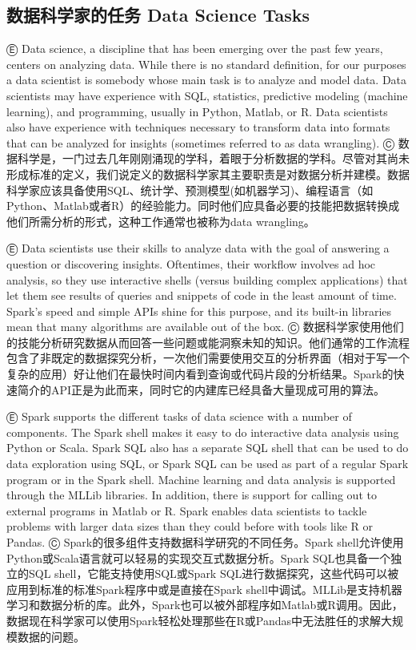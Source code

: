 \subsection{数据科学家的任务 Data Science
Tasks}\label{ux6570ux636eux79d1ux5b66ux5bb6ux7684ux4efbux52a1-data-science-tasks}

Ⓔ Data science, a discipline that has been emerging over the past few
years, centers on analyzing data. While there is no standard definition,
for our purposes a data scientist is somebody whose main task is to
analyze and model data. Data scientists may have experience with SQL,
statistics, predictive modeling (machine learning), and programming,
usually in Python, Matlab, or R. Data scientists also have experience
with techniques necessary to transform data into formats that can be
analyzed for insights (sometimes referred to as data wrangling). Ⓒ
数据科学是，一门过去几年刚刚涌现的学科，着眼于分析数据的学科。尽管对其尚未形成标准的定义，我们说定义的数据科学家其主要职责是对数据分析并建模。数据科学家应该具备使用SQL、统计学、预测模型(如机器学习)、编程语言（如Python、Matlab或者R）的经验能力。同时他们应具备必要的技能把数据转换成他们所需分析的形式，这种工作通常也被称为data
wrangling。

Ⓔ Data scientists use their skills to analyze data with the goal of
answering a question or discovering insights. Oftentimes, their workflow
involves ad hoc analysis, so they use interactive shells (versus
building complex applications) that let them see results of queries and
snippets of code in the least amount of time. Spark's speed and simple
APIs shine for this purpose, and its built-in libraries mean that many
algorithms are available out of the box. Ⓒ
数据科学家使用他们的技能分析研究数据从而回答一些问题或能洞察未知的知识。他们通常的工作流程包含了非既定的数据探究分析，一次他们需要使用交互的分析界面（相对于写一个复杂的应用）好让他们在最快时间内看到查询或代码片段的分析结果。Spark的快速简介的API正是为此而来，同时它的内建库已经具备大量现成可用的算法。

Ⓔ Spark supports the different tasks of data science with a number of
components. The Spark shell makes it easy to do interactive data
analysis using Python or Scala. Spark SQL also has a separate SQL shell
that can be used to do data exploration using SQL, or Spark SQL can be
used as part of a regular Spark program or in the Spark shell. Machine
learning and data analysis is supported through the MLLib libraries. In
addition, there is support for calling out to external programs in
Matlab or R. Spark enables data scientists to tackle problems with
larger data sizes than they could before with tools like R or Pandas. Ⓒ
Spark的很多组件支持数据科学研究的不同任务。Spark
shell允许使用Python或Scala语言就可以轻易的实现交互式数据分析。Spark
SQL也具备一个独立的SQL shell，它能支持使用SQL或Spark
SQL进行数据探究，这些代码可以被应用到标准的标准Spark程序中或是直接在Spark
shell中调试。MLLib是支持机器学习和数据分析的库。此外，Spark也可以被外部程序如Matlab或R调用。因此，数据现在科学家可以使用Spark轻松处理那些在R或Pandas中无法胜任的求解大规模数据的问题。

